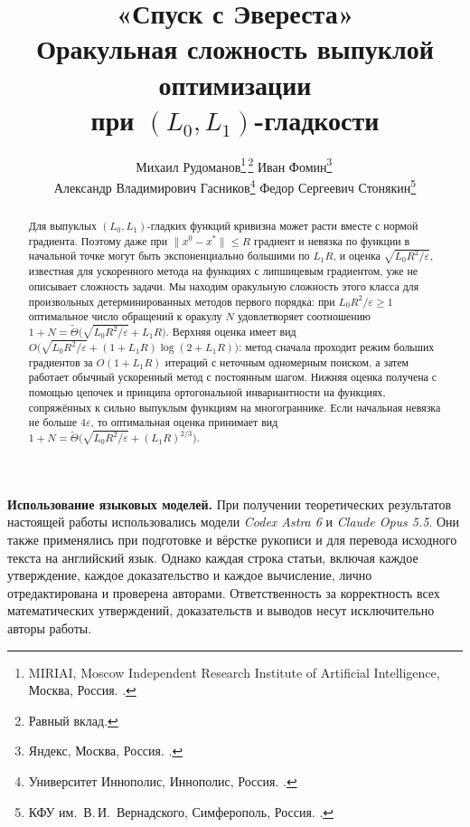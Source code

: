 \documentclass[11pt,a4paper]{article}
\title{«Спуск с Эвереста»\texorpdfstring{\\[3pt]}{: }Оракульная сложность выпуклой оптимизации\texorpdfstring{\\}{ }при \texorpdfstring{$(L_0,L_1)$}{(L0,L1)}-гладкости}
\author{%
  Михаил Рудоманов\thanks{MIRIAI, Moscow Independent Research Institute of Artificial Intelligence, Москва, Россия. \email{rudomanov.ma@phystech.edu}.}\,\thanks{Равный вклад.}\quad
  Иван Фомин\thanks{Яндекс, Москва, Россия. \email{ash-ivanfomin@yandex-team.ru}.}\,\footnotemark[2]\\[4pt]
  Александр Владимирович Гасников\thanks{Университет Иннополис, Иннополис, Россия. \email{gasnikov@yandex.ru}.}\quad
  Федор Сергеевич Стонякин\thanks{КФУ им.~В.\,И.~Вернадского, Симферополь, Россия. \email{fedyor@mail.ru}.}}
\date{}
\newcommand{\norm}[1]{\|#1\|}
\begin{document}
\begingroup
\makeatletter
\renewcommand{\@fnsymbol}[1]{\ensuremath{\ifcase#1\or\spadesuit\or\text{\tiny\faMountain}\or\clubsuit\or\dagger\or\ddagger\fi}}
\let\origmakefntext\@makefntext
\long\def\@makefntext#1{\rightskip\z@\@plus3em\relax\origmakefntext{#1}}
\makeatother
\maketitle
\endgroup

\begin{abstract}
Для выпуклых $(L_0,L_1)$-гладких функций кривизна может расти вместе с нормой градиента. Поэтому даже при $\norm{x^0-x^\ast}\le R$ градиент и невязка по функции в начальной точке могут быть экспоненциально большими по $L_1R$, и оценка $\sqrt{L_0R^2/\varepsilon}$, известная для ускоренного метода на функциях с липшицевым градиентом, уже не описывает сложность задачи. Мы находим оракульную сложность этого класса для произвольных детерминированных методов первого порядка: при $L_0R^2/\varepsilon\ge1$ оптимальное число обращений к оракулу $N$ удовлетворяет соотношению $1+N=\widetilde\Theta\bigl(\sqrt{L_0R^2/\varepsilon}+L_1R\bigr)$. Верхняя оценка имеет вид $O\bigl(\sqrt{L_0R^2/\varepsilon}+(1+L_1R)\log(2+L_1R)\bigr)$: метод сначала проходит режим больших градиентов за $O(1+L_1R)$ итераций с неточным одномерным поиском, а затем работает обычный ускоренный метод с постоянным шагом. Нижняя оценка получена с помощью цепочек и принципа ортогональной инвариантности на функциях, сопряжённых к сильно выпуклым функциям на многограннике. Если начальная невязка не больше $4\varepsilon$, то оптимальная оценка принимает вид $1+N=\widetilde\Theta\bigl(\sqrt{L_0R^2/\varepsilon}+(L_1R)^{2/3}\bigr)$.
\end{abstract}

\begin{tcolorbox}[
  optimbox,
  colback=optimBlue!3!white,
  colframe=optimBlue!40!white,
  borderline west={1.4pt}{0pt}{optimBlue},
  top=7pt,bottom=7pt
]
\small
\noindent\textbf{Использование языковых моделей.}\enspace
При получении теоретических результатов настоящей работы использовались
модели \textit{Codex Astra 6} и \textit{Claude Opus 5.5}.
Они также применялись при подготовке и вёрстке рукописи и для перевода
исходного текста на английский язык.
Однако каждая строка статьи, включая каждое утверждение, каждое
доказательство и каждое вычисление, лично отредактирована и проверена
авторами. Ответственность за корректность всех математических утверждений,
доказательств и выводов несут исключительно авторы работы.
\end{tcolorbox}
\end{document}
